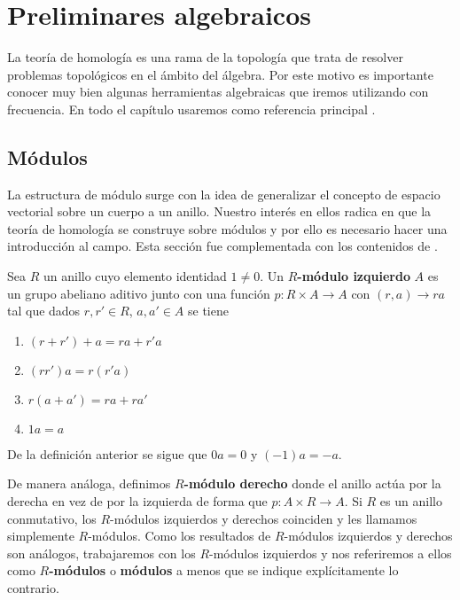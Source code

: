 
\chapter{Preliminares algebraicos}
La teoría de homología es una rama de la topología que trata de resolver problemas topológicos en el ámbito del álgebra. Por este motivo es importante conocer muy bien algunas herramientas algebraicas que iremos utilizando con frecuencia. En todo el capítulo usaremos como referencia principal \cite{maclane2012homology}.

\section{Módulos}

La estructura de módulo surge con la idea de generalizar el concepto de espacio vectorial sobre un cuerpo a un anillo. Nuestro interés en ellos radica en que la teoría de homología se construye sobre módulos y por ello es necesario hacer una introducción al campo. Esta sección fue complementada con los contenidos de \cite{dummit2004abstract}.

\begin{definicion}
	Sea $R$ un anillo cuyo elemento identidad $1 \neq 0$. Un \textbf{$R$-módulo izquierdo} $A$ es un grupo abeliano aditivo junto con una función $p: R \times A \rightarrow A$ con $(r, a) \to ra$ tal que dados $r,r' \in R$, $a,a' \in A$ se tiene
	\begin{enumerate}
		\item $(r+r')+a = ra + r'a$
		\item $(rr')a = r(r'a)$
		\item $r(a+a') = ra + ra'$
		\item $1a = a$
	\end{enumerate}
\end{definicion}

De la definición anterior se sigue que $0a = 0$ y $(-1)a = -a$.

De manera análoga, definimos \textbf{$R$-módulo derecho} donde el anillo actúa por la derecha en vez de por la izquierda de forma que $p: A \times R \rightarrow A$. Si $R$ es un anillo conmutativo, los $R$-módulos izquierdos y derechos coinciden y les llamamos simplemente $R$-módulos. Como los resultados de $R$-módulos izquierdos y derechos son análogos, trabajaremos con los $R$-módulos izquierdos y nos referiremos a ellos como \textbf{$R$-módulos} o \textbf{módulos} a menos que se indique explícitamente lo contrario.

